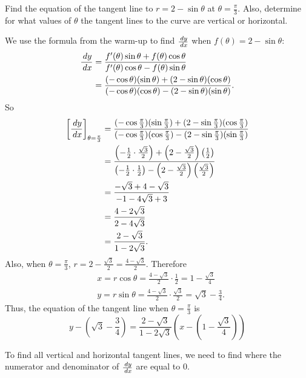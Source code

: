 \documentclass[]{ximera}
\begin{document}
\begin{problem}
Find the equation of the tangent line to $r = 2 - \sin \theta$ at $\theta = \frac{\pi}{3}$.  
Also, determine for what values of $\theta$ the tangent lines to the curve are vertical or horizontal.
	\begin{freeResponse}
	We use the formula from the warm-up to find $\frac{\,d y}{\,d x}$ when $f(\theta) = 2 - \sin \theta$:
		\begin{align*}
		\frac{\,d y}{\,d x}
		&= \frac{f'(\theta) \sin \theta + f(\theta) \cos \theta}{f'(\theta) \cos \theta - f(\theta) \sin \theta } \\
		&= \frac{(- \cos \theta)(\sin \theta) + (2 - \sin \theta)(\cos \theta)}{(-\cos \theta)(\cos \theta) - (2 - \sin \theta)(\sin \theta)}.
		\end{align*}
	So
		\begin{align*}
		\bigg[ \frac{\,d y}{\,d x} \bigg]_{\theta = \frac{\pi}{3}} 
		&= \frac{(- \cos \frac{\pi}{3})(\sin \frac{\pi}{3}) + (2 - \sin \frac{\pi}{3})(\cos \frac{\pi}{3})}{(-\cos \frac{\pi}{3})(\cos \frac{\pi}{3}) - (2 - \sin \frac{\pi}{3})(\sin \frac{\pi}{3})}  \\
		&= \frac{\left( - \frac{1}{2} \cdot \frac{\sqrt{3}}{2} \right) + \left( 2 - \frac{\sqrt{3}}{2} \right) \left( \frac{1}{2} \right)}{\left( - \frac{1}{2} \cdot \frac{1}{2} \right) - \left( 2 - \frac{\sqrt{3}}{2} \right) \left( \frac{\sqrt{3}}{2} \right)}  \\
		&= \frac{- \sqrt{3} + 4 - \sqrt{3}}{-1 - 4 \sqrt{3} + 3}  \\
		&= \frac{4 - 2 \sqrt{3}}{2 - 4 \sqrt{3}}  \\
		&= \frac{2 - \sqrt{3}}{1 - 2 \sqrt{3}}.
		\end{align*}
	Also, when $\theta = \frac{\pi}{3}$, $r = 2 - \frac{\sqrt{3}}{2} = \frac{4 - \sqrt{3}}{2}$.  
	Therefore
		\begin{align*}
		&x = r \cos \theta = \frac{4 - \sqrt{3}}{2} \cdot \frac{1}{2} = 1 - \frac{\sqrt{3}}{4}  \\
		&y = r \sin \theta = \frac{4 - \sqrt{3}}{2} \cdot \frac{\sqrt{3}}{2} = \sqrt{3} - \frac{3}{4}.
		\end{align*}
	Thus, the equation of the tangent line when $\theta = \frac{\pi}{3}$ is
		\[
		\boxed{y - \left( \sqrt{3} - \frac{3}{4} \right) = \frac{2 - \sqrt{3}}{1 - 2 \sqrt{3}} \left( x - \left( 1 - \frac{\sqrt{3}}{4} \right) \right)}
		\]
		
	To find all vertical and horizontal tangent lines, we need to find where the numerator and denominator of $\frac{\,d y}{\,d x}$ are equal to $0$.
	

\end{freeResponse}
\end{problem}
\end{document}
